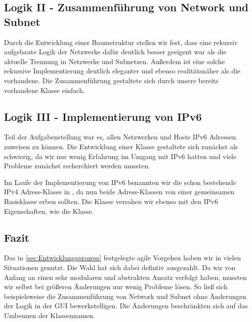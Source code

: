 \subsection{Logik II - Zusammenführung von Network und Subnet}
Durch die Entwicklung einer Baumstruktur stellen wir fest, dass eine rekursiv aufgebaute Logik der
Netzwerke dafür deutlich besser geeigent war als die aktuelle Trennung in Netzwerke und Subnetzen.
Außerdem ist eine solche rekursive Implementierung deutlich eleganter und ebenso realitätsnäher
als die vorhandene.
Die Zusammenführung gestaltete sich durch unsere bereits vorhandene  Klasse einfach.

\subsection{Logik III - Implementierung von IPv6}
Teil der Aufgabenstellung war es, allen Netzwerken und Hosts IPv6 Adressen zuweisen zu können.
Die Entwicklung einer  Klasse gestaltete sich zunächst als schwierig, da wir nur
wenig Erfahrung im Umgang mit IPv6 hatten und viele Probleme zunächst recherchiert werden mussten.

Im Laufe der Implementierung von IPv6 benannten wir die schon bestehende IPv4 Adress-Klasse in ,
da nun beide Adress-Klassen von einer gemeinsamen Basisklasse  erben sollten.
Die  Klasse versahen wir ebenso mit den IPv6 Eigenschaften, wie die  Klasse.

\subsection{Fazit}
Das in \ref{sec:Entwicklungsprozess} festgelegte agile Vorgehen haben wir in vielen Situationen
genutzt. Die Wahl hat sich dabei defintiv ausgezahlt.
Da wir von Anfang an einen sehr modularen und abstrakten Ansatz verfolgt haben,
mussten wir selbst bei größeren Änderungen nur wenig Probleme lösen. So ließ sich beispielsweise
die Zusammenführung von Network und Subnet ohne Änderungen der Logik in der GUI bewerkstelligen. Die
Änderungen beschränkten sich auf das Umbennen der Klassennamen.
